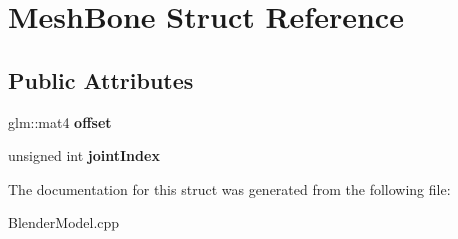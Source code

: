 \hypertarget{structMeshBone}{\section{\-Mesh\-Bone \-Struct \-Reference}
\label{structMeshBone}
}
\subsection*{\-Public \-Attributes}
\begin{DoxyCompactItemize}
\item 
\hypertarget{structMeshBone_ace96ddc114e7c75a566ff9a12c95140b}{glm\-::mat4 {\bfseries offset}}\label{structMeshBone_ace96ddc114e7c75a566ff9a12c95140b}

\item 
\hypertarget{structMeshBone_a406e4617b915a72c363cf5c4fc6eacc7}{unsigned int {\bfseries joint\-Index}}\label{structMeshBone_a406e4617b915a72c363cf5c4fc6eacc7}

\end{DoxyCompactItemize}


\-The documentation for this struct was generated from the following file\-:\begin{DoxyCompactItemize}
\item 
\-Blender\-Model.\-cpp\end{DoxyCompactItemize}
